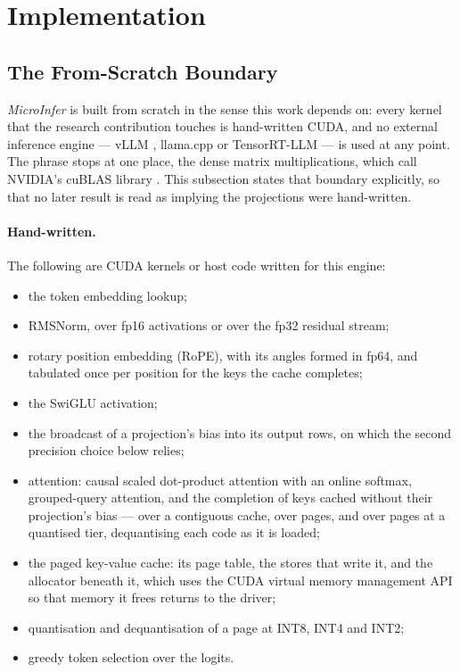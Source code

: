 \documentclass[11pt]{article}
\begin{document}
\section{Implementation}
\label{sec:implementation}

\subsection{The From-Scratch Boundary}
\label{sec:boundary}

\textit{MicroInfer} is built from scratch in the sense this work depends on:
every kernel that the research contribution touches is hand-written CUDA, and no
external inference engine --- vLLM \cite{kwon2023pagedattention}, llama.cpp
\cite{llamacpp} or TensorRT-LLM \cite{tensorrtllm} --- is used at any point. The
phrase stops at one place, the dense matrix multiplications, which call NVIDIA's
cuBLAS library \cite{cublas}. This subsection states that boundary explicitly, so
that no later result is read as implying the projections were hand-written.

\paragraph{Hand-written.} The following are CUDA kernels or host code written for
this engine:
\begin{itemize}
\item the token embedding lookup;
\item RMSNorm, over fp16 activations or over the fp32 residual stream;
\item rotary position embedding (RoPE), with its angles formed in fp64, and
tabulated once per position for the keys the cache completes;
\item the SwiGLU activation;
\item the broadcast of a projection's bias into its output rows, on which the
second precision choice below relies;
\item attention: causal scaled dot-product attention with an online softmax,
grouped-query attention, and the completion of keys cached without their
projection's bias --- over a contiguous cache, over pages, and over pages at a
quantised tier, dequantising each code as it is loaded;
\item the paged key-value cache: its page table, the stores that write it, and
the allocator beneath it, which uses the CUDA virtual memory management API so
that memory it frees returns to the driver;
\item quantisation and dequantisation of a page at INT8, INT4 and INT2;
\item greedy token selection over the logits.
\end{itemize}
\end{document}
